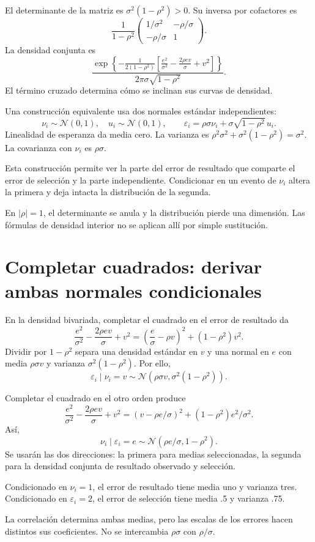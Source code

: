 \documentclass[11pt,a4paper]{article}
\begin{document}
El determinante de la matriz es
\(\sigma^2(1-\rho^2)>0\).
Su inversa por cofactores es
\[
\frac1{1-\rho^2}
\begin{pmatrix}
1/\sigma^2&-\rho/\sigma\\
-\rho/\sigma&1
\end{pmatrix}.
\]
La densidad conjunta es
\[
\frac{\exp\left\{
-\frac1{2(1-\rho^2)}
\left[\frac{e^2}{\sigma^2}
-\frac{2\rho ev}{\sigma}+v^2\right]\right\}}
{2\pi\sigma\sqrt{1-\rho^2}}.
\]
El término cruzado determina cómo
se inclinan sus curvas de densidad.

Una construcción equivalente usa
dos normales estándar independientes:
\[
\nu_i\sim\mathcal N(0,1),\quad u_i\sim\mathcal N(0,1),
\qquad
\varepsilon_i=\rho\sigma\nu_i
+\sigma\sqrt{1-\rho^2}\,u_i.
\]
Linealidad de esperanza da media cero.
La varianza es
\(\rho^2\sigma^2+\sigma^2(1-\rho^2)=\sigma^2\).
La covarianza con \(\nu_i\) es \(\rho\sigma\).

Esta construcción permite ver la parte
del error de resultado que comparte
el error de selección y la parte independiente.
Condicionar en un evento de \(\nu_i\)
altera la primera y deja intacta
la distribución de la segunda.

En \(|\rho|=1\), el determinante se anula
y la distribución pierde una dimensión.
Las fórmulas de densidad interior
no se aplican allí por simple sustitución.


\clearpage
\section{Completar cuadrados: derivar ambas normales condicionales}

En la densidad bivariada, completar
el cuadrado en el error de resultado da
\[
\frac{e^2}{\sigma^2}
-\frac{2\rho ev}{\sigma}+v^2
=\left(\frac e\sigma-\rho v\right)^2
+(1-\rho^2)v^2.
\]
Dividir por \(1-\rho^2\) separa
una densidad estándar en \(v\)
y una normal en \(e\) con media
\(\rho\sigma v\) y varianza
\(\sigma^2(1-\rho^2)\).
Por ello,
\[
\varepsilon_i\mid\nu_i=v
\sim\mathcal N(\rho\sigma v,\sigma^2(1-\rho^2)).
\]

Completar el cuadrado en el otro orden produce
\[
\frac{e^2}{\sigma^2}
-\frac{2\rho ev}{\sigma}+v^2
=(v-\rho e/\sigma)^2
+(1-\rho^2)e^2/\sigma^2.
\]
Así,
\[
\nu_i\mid\varepsilon_i=e
\sim\mathcal N(\rho e/\sigma,1-\rho^2).
\]
Se usarán las dos direcciones:
la primera para medias seleccionadas,
la segunda para la densidad conjunta
de resultado observado y selección.

\begin{ejemplo}
Condicionado en \(\nu_i=1\),
el error de resultado tiene media uno
y varianza tres.
Condicionado en \(\varepsilon_i=2\),
el error de selección tiene media .5
y varianza .75.
\end{ejemplo}
La correlación determina ambas medias,
pero las escalas de los errores
hacen distintos sus coeficientes.
No se intercambia \(\rho\sigma\)
con \(\rho/\sigma\).
\end{document}
